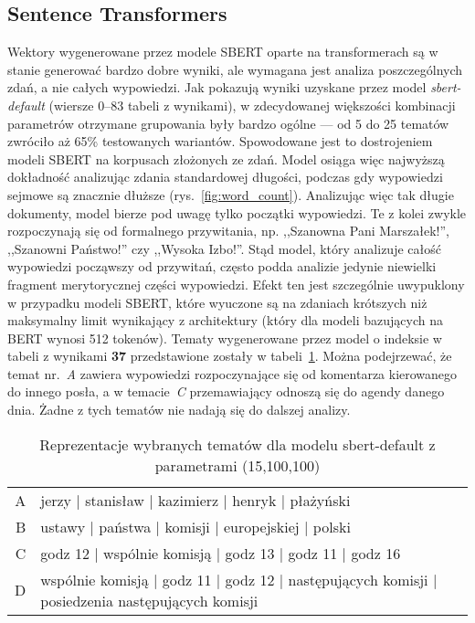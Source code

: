 	\subsection{Sentence Transformers}\label{sec:sbert_summary}
		Wektory wygenerowane przez modele SBERT oparte na transformerach są w stanie generować bardzo dobre wyniki,
			ale wymagana jest analiza poszczególnych zdań, a nie całych wypowiedzi.
		Jak pokazują wyniki uzyskane przez model \emph{sbert-default} (wiersze 0--83 tabeli z wynikami),
			w zdecydowanej większości kombinacji parametrów otrzymane grupowania były bardzo ogólne --- od 5 do 25 tematów zwróciło aż 65\% testowanych wariantów.
		Spowodowane jest to dostrojeniem modeli SBERT na korpusach złożonych ze zdań.
		Model osiąga więc najwyższą dokładność analizując zdania standardowej długości, podczas gdy wypowiedzi sejmowe są znacznie dłuższe (rys.~\ref{fig:word_count}).
		Analizując więc tak długie dokumenty, model bierze pod uwagę tylko początki wypowiedzi.
		Te z kolei zwykle rozpoczynają się od formalnego przywitania, np. ,,Szanowna Pani Marszałek!'', ,,Szanowni Państwo!'' czy ,,Wysoka Izbo!''.
		Stąd model, który analizuje całość wypowiedzi począwszy od przywitań, często podda analizie jedynie niewielki fragment merytorycznej części wypowiedzi.
		Efekt ten jest szczególnie uwypuklony w przypadku modeli SBERT, które wyuczone są na zdaniach krótszych niż maksymalny limit wynikający z architektury
			(który dla modeli bazujących na BERT wynosi 512 tokenów).
		Tematy wygenerowane przez model o indeksie w tabeli z wynikami \textbf{37} przedstawione zostały w tabeli~\ref{tab:sbert_default_topics}.
		Można podejrzewać, że temat nr.~\emph{A} zawiera wypowiedzi rozpoczynające się od komentarza kierowanego do innego posła, a w temacie~\emph{C} przemawiający odnoszą się do agendy danego dnia.
		Żadne z tych tematów nie nadają się do dalszej analizy.

		\begin{table}[htb]
			\caption{Reprezentacje wybranych tematów dla modelu sbert-default z parametrami (15,100,100)}\label{tab:sbert_default_topics} %
			\centering
			\small
			\begin{tabularx}{\textwidth}{rl}
				\toprule
				A & jerzy | stanisław | kazimierz | henryk | płażyński \\
				B & ustawy | państwa | komisji | europejskiej | polski \\
				C & godz 12 | wspólnie komisją | godz 13 | godz 11 | godz 16 \\
				D & wspólnie komisją | godz 11 | godz 12 | następujących komisji | posiedzenia następujących komisji \\
				\bottomrule
			\end{tabularx}
		\end{table}

